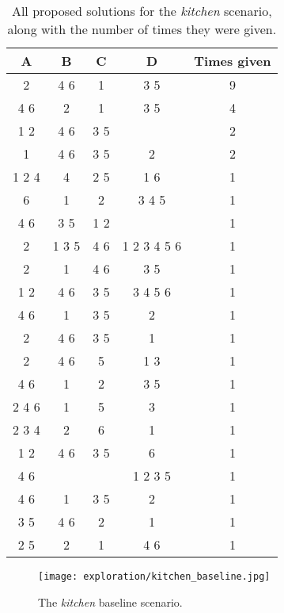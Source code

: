 \begin{table}
    \centering
    \begin{tabular}{|c|c|c|c|c|} 
    \hline
    A     & B   & C   & D             & Times given \\
    \hline
    2     & 4 6   & 1   & 3 5         & 9 \\
    4 6   & 2     & 1   & 3 5         & 4 \\
    1 2   & 4 6   & 3 5 &             & 2 \\
    1     & 4 6   & 3 5 & 2           & 2 \\
    1 2 4 & 4     & 2 5 & 1 6         & 1 \\
    6     & 1     & 2   & 3 4 5       & 1 \\
    4 6   & 3 5   & 1 2 &             & 1 \\
    2     & 1 3 5 & 4 6 & 1 2 3 4 5 6 & 1 \\
    2     & 1     & 4 6 & 3 5         & 1 \\
    1 2   & 4 6   & 3 5 & 3 4 5 6     & 1 \\
    4 6   & 1     & 3 5 & 2           & 1 \\
    2     & 4 6   & 3 5 & 1           & 1 \\
    2     & 4 6   & 5   & 1 3         & 1 \\
    4 6   & 1     & 2   & 3 5         & 1 \\
    2 4 6 & 1     & 5   & 3           & 1 \\
    2 3 4 & 2     & 6   & 1           & 1 \\
    1 2   & 4 6   & 3 5 & 6           & 1 \\
    4 6   &       &     & 1 2 3 5     & 1 \\
    4 6   & 1     & 3 5 & 2           & 1 \\
    3 5   & 4 6   & 2   & 1           & 1 \\
    2 5   & 2     & 1   & 4 6         & 1 \\
    \hline
\end{tabular}
\caption{All proposed solutions for the \textit{kitchen} scenario, along with the number of times they were given.}
\label{table:kitchen_answers}
\end{table}

\begin{figure}
    \centering
    \texttt{[image: exploration/kitchen\_baseline.jpg]}
    \caption{The \textit{kitchen} baseline scenario.}
    \label{fig:explor:kitchen_baseline_again}
\end{figure}

